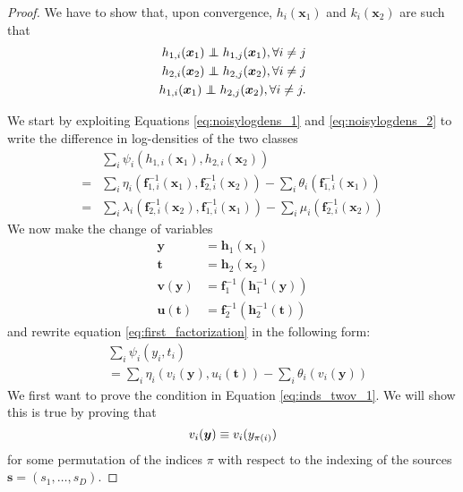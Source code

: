 \begin{proof}
	We have to
	show that, upon convergence, $h_{i}(\bm{x}_{1})$ and $k_{i}(\bm{x}_{2})$
	are such that
	\begin{align}
	h_{1,i}(\bm{x}_{1})\independent h_{1,j}(\bm{x}_{1}),\forall i\neq j \label{eq:inds_twov_1} \\
	h_{2,i}(\bm{x}_{2})\independent h_{2,j}(\bm{x}_{2}),\forall i\neq j \label{eq:inds_twov_2}\\
	h_{1,i}(\bm{x}_{1})\independent h_{2,j}(\bm{x}_{2}),\forall i\neq j. \label{eq:inds_twov_3}
	\end{align}
	
	We start by exploiting Equations \ref{eq:noisylogdens_1} and \ref{eq:noisylogdens_2} to write the difference in log-densities of the two classes
	\begin{align}
	&\sum_{i}\psi_{i}(h_{1,i}(\bm{x}_{1}),h_{2,i}(\bm{x}_{2}))\nonumber\\
	=&\sum_{i}\eta_{i}(\bm{f}_{1,i}^{-1}(\bm{x}_{1}), \bm{f}_{2,i}^{-1}(\bm{x}_{2})) - \sum_{i}\theta_{i}(\bm{f}_{1,i}^{-1}(\bm{x}_{1})) \label{eq:first_factorization}\\
	=&\sum_{i}\lambda_{i}(\bm{f}_{2,i}^{-1}(\bm{x}_{2}), \bm{f}_{1,i}^{-1}(\bm{x}_{1})) - \sum_{i}\mu_{i}(\bm{f}_{2,i}^{-1}(\bm{x}_{2}))\label{eq:2nd_factorization}
	\end{align}
	We now make the change of variables
	\begin{align*}
	\bm{y} & =\bm{h}_1(\bm{x}_{1})\\
	\bm{t} & =\bm{h}_2(\bm{x}_{2})\\
	\bm{v}(\bm{y}) & =\bm{f}_{1}^{-1}(\bm{h}_1^{-1}(\bm{y}))\\
	\bm{u}(\bm{t}) & =\bm{f}_{2}^{-1}(\bm{h}_2^{-1}(\bm{t}))
	\end{align*}
	and rewrite equation \ref{eq:first_factorization} in the following form:
	\begin{align}
	&\sum_{i}\psi_{i}(y_{i},t_{i}) \nonumber \\
	&=\sum_{i}\eta_{i}(v_i(\bm{y}), u_i(\bm{t}))
	-\sum_{i}\theta_{i}(v_i(\bm{y}))\label{eq:logistic}
	\end{align}
	We first want to prove the condition in Equation \ref{eq:inds_twov_1}.
	We will show this is true by proving that
	\begin{equation}
	\label{eq:v_onev}
	v_{i}(\bm{y})  \equiv v_{i}(y_{\pi(i)})\\
	\end{equation}
	for some permutation of the indices $\pi$ with respect to the indexing of the sources $\bm{s} = (s_1, \ldots, s_D)$.
	

\end{proof}
